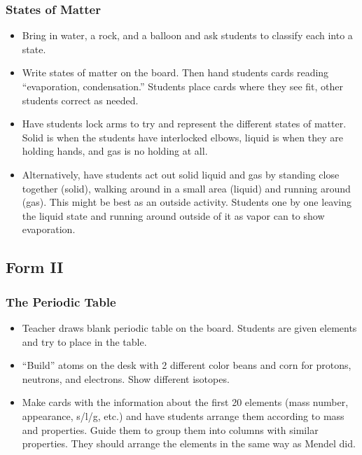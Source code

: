 \subsubsection{States of Matter}
\begin{itemize}
\item	Bring in water, a rock, and a balloon and ask students to classify each into a state.
\item	Write states of matter on the board.  Then hand students cards reading ``evaporation, condensation.''  Students place cards where they see fit, other students correct as needed.
\item	Have students lock arms to try and represent the different states of matter. Solid is when the students have interlocked elbows, liquid is when they are holding hands, and gas is no holding at all.
\item	Alternatively, have students act out solid liquid and gas by standing close together (solid), walking around in a small area (liquid) and running around (gas). This might be best as an outside activity. Students one by one leaving the liquid state and running around outside of it as vapor can to show evaporation.
\end{itemize}

\subsection{Form II}
\subsubsection{The Periodic Table}
\begin{itemize}
\item	Teacher draws blank periodic table on the board.  Students are given elements and try to place in the table.
\item	``Build'' atoms on the desk with 2 different color beans and corn for protons, neutrons, and electrons. Show different isotopes.
\item	Make cards with the information about the first 20 elements (mass number, appearance, s/l/g, etc.) and have students arrange them according to mass and properties. Guide them to group them into columns with similar properties. They should arrange the elements in the same way as Mendel did.  
\end{itemize}

